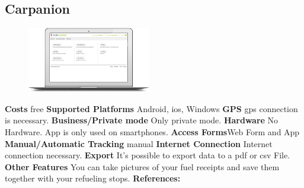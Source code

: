\begin{singlespace}
\section{Carpanion}
\begin{figure}
  \begin{center}
    \includegraphics[width=0.48\textwidth]{bilder/Carpanion1}
  \end{center}
\end{figure}
\textbf{Costs} free
\newline\newline
\textbf{Supported Platforms} Android, \gls{ios}, Windows
\newline\newline
\textbf{GPS} \gls{gps} connection is necessary.
\newline\newline
\textbf{Business/Private mode} Only private mode.
\newline\newline
\textbf{Hardware} No Hardware. App is only used on smartphones.
\newline\newline
\textbf{Access Forms}Web Form and App
\newline\newline
\textbf{Manual/Automatic Tracking} manual
\newline\newline
\textbf{Internet Connection} Internet connection necessary.
\newline\newline
\textbf{Export} It’s possible to export data to a \gls{pdf} or \gls{csv} File.
\newline\newline
\textbf{Other Features} You can take pictures of your fuel receipts and save them together with your refueling stops.
\newline\newline
\textbf{References:} \cite{Carpanion}
\newpage
\clearpageauthor

\end{singlespace}
